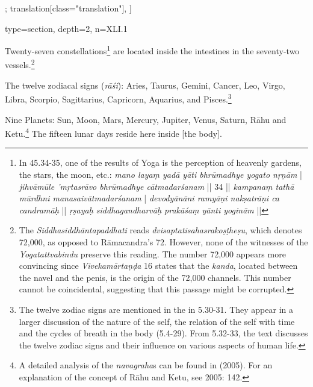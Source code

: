\begin{alignment}[
  texts=edition[class="edition"];
  translation[class="translation"],
  ]
\begin{translation}
{      type=section,
      depth=2, 
      n=XLI.1
    }
    \label{starstrans}
    \begin{tlate}[p41_01]
\noindent
Twenty-seven constellations\footnote{In  45.34-35, one of the results of Yoga is the perception of heavenly gardens, the stars, the moon, etc.: \textit{mano layaṃ yadā yāti bhrūmadhye yogato nṛṇām} | \textit{jihvāmūle 'mṛtasrāvo bhrūmadhye cātmadarśanam} || 34 || \textit{kampanaṃ tathā mūrdhni manasaivātmadarśanam} | \textit{devodyānāni ramyāṇi nakṣatrāṇi ca candramāḥ} || \textit{ṛṣayaḥ siddhagandharvāḥ prakāśaṃ yānti yoginām} ||} are located inside the intestines in the seventy-two vessels.\footnote{The \emph{Siddhasiddhāntapaddhati} reads \textit{dvisaptatisahasrakoṣṭheṣu}, which denotes 72,000, as opposed to Rāmacandra's 72. However, none of the witnesses of the \emph{Yogatattvabindu} preserve this reading. The number 72,000 appears more convincing since \emph{Vivekamārtaṇḍa} 16 states that the \emph{kanda}, located between the navel and the penis, is the origin of the 72,000 channels. This number cannot be coincidental, suggesting that this passage might be corrupted.}

The twelve zodiacal signs (\textit{rāśi}): Aries, Taurus, Gemini, Cancer, Leo, Virgo, Libra, Scorpio, Sagittarius, Capricorn, Aquarius, and Pisces.\footnote{The twelve zodiac signs are mentioned in the  in 5.30-31. They appear in a larger discussion of the nature of the self, the relation of the self with time and the cycles of breath in the body (5.4-29). From 5.32-33, the text discusses the twelve zodiac signs and their influence on various aspects of human life.} 

Nine Planets: Sun, Moon, Mars, Mercury, Jupiter, Venus, Saturn, Rāhu and Ketu.\footnote{A detailed analysis of the \textit{navagraha}s can be found in \citeauthor{kropf2005} (2005). For an explanation of the concept of Rāhu and Ketu, see \citeauthor{kropf2005} 2005: 142.} The fifteen lunar days reside here inside [the body].


\end{tlate}
\end{translation}
\end{alignment}
